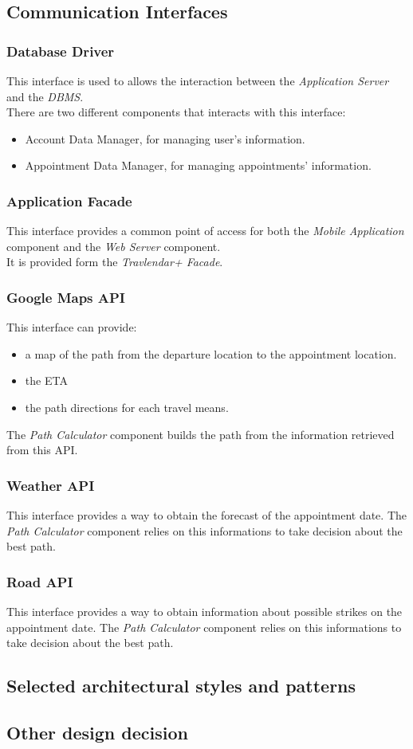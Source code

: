 \clearpage
\subsection{Communication Interfaces}
\subsubsection{Database Driver}
This interface is used to allows the interaction between the \emph{Application Server} and the \emph{DBMS}.\\
There are two different components that interacts with this interface:
\begin{itemize}
	\item Account Data Manager, for managing user's information.
	\item Appointment Data Manager, for managing appointments' information.
\end{itemize}

\subsubsection{Application Facade}
This interface provides a common point of access for both the \emph{Mobile Application} component and the \emph{Web Server} component.\\
It is provided form the \emph{Travlendar+ Facade}.

\subsubsection{Google Maps API}
This interface can provide:
\begin{itemize}
	\item a map of the path from the departure location to the appointment location.
	\item the ETA
	\item the path directions for each travel means.
\end{itemize}
The \emph{Path Calculator} component builds the path from the information retrieved from this API.

\subsubsection{Weather API}
This interface provides a way to obtain the forecast of the appointment date.
The \emph{Path Calculator} component relies on this informations to take decision about the best path.

\subsubsection{Road API}
This interface provides a way to obtain information about possible strikes on the appointment date.
The \emph{Path Calculator} component relies on this informations to take decision about the best path.

\clearpage
\subsection{Selected architectural styles and patterns}

\clearpage
\subsection{Other design decision}